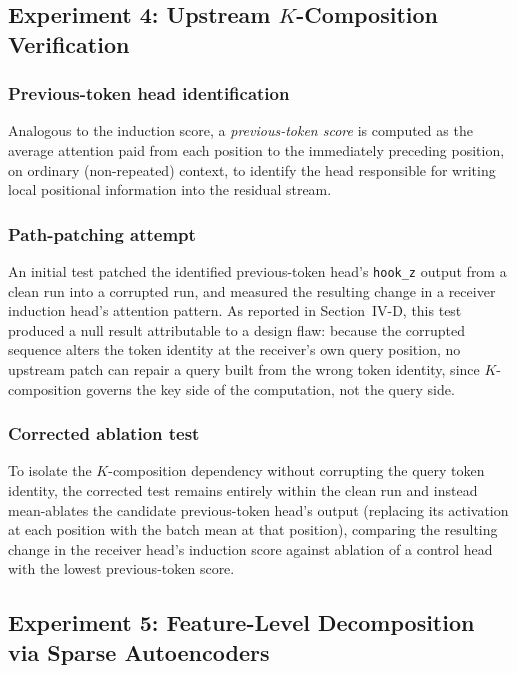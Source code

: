 \documentclass[conference]{IEEEtran}
\begin{document}
\subsection{Experiment 4: Upstream $K$-Composition Verification}

\subsubsection{Previous-token head identification}
Analogous to the induction score, a \emph{previous-token score} is computed as the average attention paid from each position to the immediately preceding position, on ordinary (non-repeated) context, to identify the head responsible for writing local positional information into the residual stream.

\subsubsection{Path-patching attempt}
An initial test patched the identified previous-token head's \texttt{hook\_z} output from a clean run into a corrupted run, and measured the resulting change in a receiver induction head's attention pattern. As reported in Section~IV-D, this test produced a null result attributable to a design flaw: because the corrupted sequence alters the token identity at the receiver's own query position, no upstream patch can repair a query built from the wrong token identity, since $K$-composition governs the key side of the computation, not the query side.

\subsubsection{Corrected ablation test}
To isolate the $K$-composition dependency without corrupting the query token identity, the corrected test remains entirely within the clean run and instead mean-ablates the candidate previous-token head's output (replacing its activation at each position with the batch mean at that position), comparing the resulting change in the receiver head's induction score against ablation of a control head with the lowest previous-token score.

\subsection{Experiment 5: Feature-Level Decomposition via Sparse Autoencoders}
\end{document}
